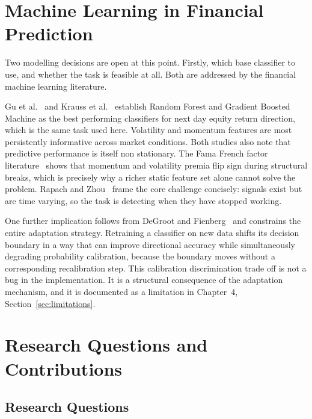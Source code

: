 \section{Machine Learning in Financial Prediction}
\label{sec:ml_finance}

Two modelling decisions are open at this point. Firstly, which base classifier to use, and whether the task is feasible at all. Both are addressed by the financial machine learning literature.

Gu et al.~\cite{gu2020} and Krauss et al.~\cite{krauss2017} establish Random Forest and Gradient Boosted Machine as the best performing classifiers for next day equity return direction, which is the same task used here. Volatility and momentum features are most persistently informative across market conditions. Both studies also note that predictive performance is itself non stationary. The Fama French factor literature~\cite{fama1993} shows that momentum and volatility premia flip sign during structural breaks, which is precisely why a richer static feature set alone cannot solve the problem. Rapach and Zhou~\cite{rapach2013} frame the core challenge concisely: signals exist but are time varying, so the task is detecting when they have stopped working.

One further implication follows from DeGroot and Fienberg~\cite{degroot1983} and constrains the entire adaptation strategy. Retraining a classifier on new data shifts its decision boundary in a way that can improve directional accuracy while simultaneously degrading probability calibration, because the boundary moves without a corresponding recalibration step. This calibration discrimination trade off is not a bug in the implementation. It is a structural consequence of the adaptation mechanism, and it is documented as a limitation in Chapter~4, Section~\ref{sec:limitations}.

\section{Research Questions and Contributions}
\label{sec:rqs}

\subsection{Research Questions}

